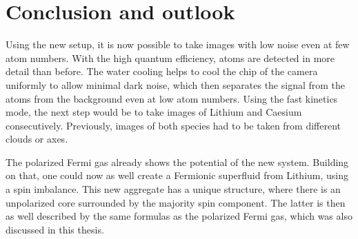 \chapter{Conclusion and outlook}

Using the new setup, it is now possible to take images with low noise even at few atom numbers. With the high quantum efficiency, atoms are detected in more detail than before. The water cooling helps to cool the chip of the camera uniformly to allow minimal dark noise, which then separates the signal from the atoms from the background even at low atom numbers. Using the fast kinetics mode, the next step would be to take images of Lithium and Caesium consecutively. Previously, images of both species had to be taken from different clouds or axes.

The polarized Fermi gas already shows the potential of the new system. Building on that, one could now as well create a Fermionic superfluid from Lithium, using a spin imbalance. This new aggregate has a unique structure, where there is an unpolarized core surrounded by the majority spin component. The latter is then as well described by the same formulas as the polarized Fermi gas, which was also discussed in this thesis.

